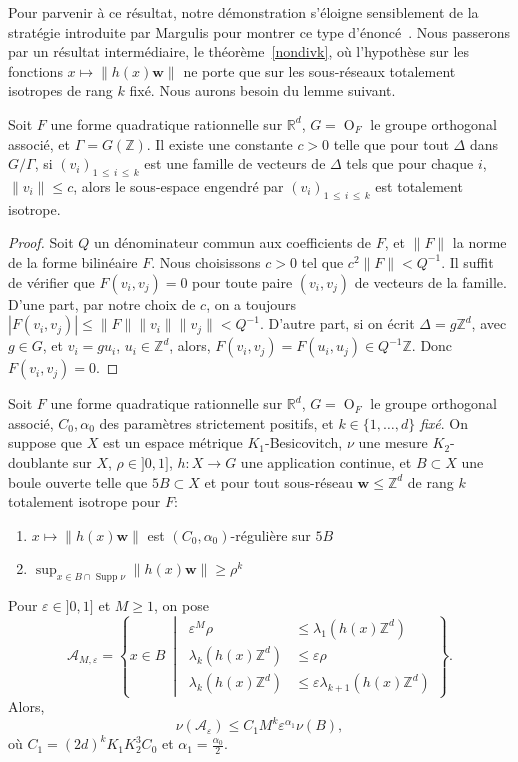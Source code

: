 \documentclass[AHL,Unicode,longabstracts,francais,published]{cedram}
\DeclareMathOperator{\GO}{O}
\DeclareMathOperator{\Supp}{Supp}
\newcommand{\se}[2]{\{#1,\dots,#2\}}
\newcommand{\R}{\mathbb{R}}
\newcommand{\Z}{\mathbb{Z}}
\newcommand{\bw}{\mathbf{w}}
\newcommand{\cA}{\mathcal{A}}
\newcommand{\eps}{\varepsilon}
\begin{document}
Pour parvenir à ce résultat, notre démonstration s'éloigne sensiblement de la stratégie introduite par Margulis pour montrer ce type d'énoncé~\cite{dani_, kleinbockmargulis,margulis_}. Nous passerons par un résultat intermédiaire, le théorème~\ref{nondivk}, où l'hypothèse sur les fonctions $x\mapsto \|h(x)\bw\|$ ne porte que sur les sous-réseaux totalement isotropes de rang $k$ fixé. Nous aurons besoin du lemme suivant.

\begin{lemm}\label{isotrope}
Soit $F$ une forme quadratique rationnelle sur $\R^d$, $G=\GO_F$ le groupe orthogonal associé, et $\Gamma=G(\Z)$. Il existe une constante $c>0$ telle que pour tout $\Delta$ dans $G/\Gamma$, si $(v_i)_{1\,\leq\,i\,\leq\,k}$ est une famille de vecteurs de $\Delta$ tels que pour chaque $i$, $\|v_i\|\leq c$, alors le sous-espace engendré par $(v_i)_{1\,\leq\,i\,\leq\,k}$ est totalement isotrope.
\end{lemm}

\begin{proof}
Soit $Q$ un dénominateur commun aux coefficients de $F$, et $\|F\|$ la norme de la forme bilinéaire $F$. Nous choisissons $c>0$ tel que $c^2\|F\|<Q^{-1}$. Il suffit de vérifier que $F(v_i,v_j)=0$ pour toute paire $(v_i,v_j)$ de vecteurs de la famille. D'une part, par notre choix de $c$, on a toujours $|F(v_i,v_j)|\leq \|F\|\|v_i\|\|v_j\| < Q^{-1}$. D'autre part, si on écrit $\Delta=g\Z^d$, avec $g\in G$, et $v_i=gu_i$, $u_i\in\Z^d$, alors, $F(v_i,v_j)=F(u_i,u_j)\in Q^{-1}\Z$. Donc $F(v_i,v_j)=0$.
\end{proof}



\begin{theo}\label{nondivk}
Soit $F$ une forme quadratique rationnelle sur $\R^d$, $G=\GO_F$ le groupe orthogonal associé, $C_0,\alpha_0$ des paramètres strictement positifs, et $k\in\se{1}{d}$ \emph{fixé}. On suppose que $X$ est un espace métrique $K_1$-Besicovitch, $\nu$ une mesure $K_2$-doublante sur $X$, $\rho\in]0,1]$, $h:X\to G$ une application continue, et $B\subset X$ une boule ouverte telle que $5B\subset X$ et pour tout sous-réseau $\bw\leq\Z^d$ de rang $k$ totalement isotrope pour $F$:
\begin{enumerate}
\item $x\mapsto \|h(x)\bw\|$ est $(C_0,\alpha_0)$-régulière sur $5B$
\item \label{rhok'}
$\sup_{x\in B\cap\Supp\nu}\|h(x)\bw\|\geq\rho^k$
\end{enumerate}
Pour $\eps\in]0,1]$ et $M\geq 1$, on pose
\[
\cA_{M,\eps} = \left\{x\in B\ \middle|\
\begin{split}
\eps^M\rho &\leq\lambda_1\left(h(x)\Z^d\right)\\
\lambda_k\left(h(x)\Z^d\right)&\leq\eps\rho\\
\lambda_k\left(h(x)\Z^d\right)&\leq\eps\lambda_{k+1}\left(h(x)\Z^d\right)
\end{split}
\right\}.
\]
Alors,
\[
\nu(\cA_\eps)
\leq C_1M^k\eps^{\alpha_1}\nu(B),
\]
où $C_1=(2d)^kK_1K_2^3C_0$ et $\alpha_1=\frac{\alpha_0}{2}$.
\end{theo}
\end{document}
